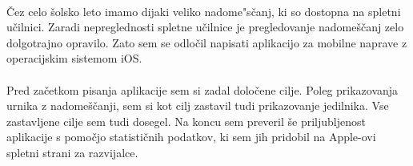 \paragraph{} Čez celo šolsko leto imamo dijaki veliko nadome"sčanj, ki so dostopna na spletni učilnici. Zaradi nepreglednosti spletne učilnice je pregledovanje nadomeščanj zelo dolgotrajno opravilo. Zato sem se odločil napisati aplikacijo za mobilne naprave z operacijskim sistemom iOS\cite{ios-wiki}.

\paragraph{} Pred začetkom pisanja aplikacije sem si zadal določene cilje. Poleg prikazovanja urnika z nadomeščanji, sem si kot cilj zastavil tudi prikazovanje jedilnika. Vse zastavljene cilje sem tudi dosegel. Na koncu sem preveril še priljubljenost aplikacije s pomočjo statističnih podatkov, ki sem jih pridobil na Apple-ovi spletni strani za razvijalce.